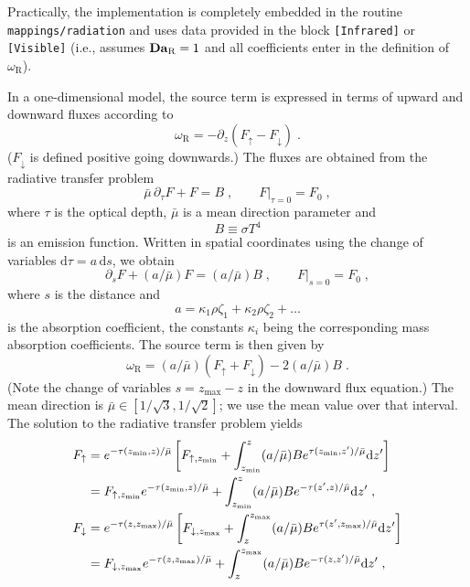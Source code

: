 Practically, the implementation is completely embedded in the routine {\tt mappings/radiation} and uses data provided in the block \texttt{[Infrared]} or \texttt{[Visible]} (i.e., assumes $\mathrm{\bf Da}_\mathrm{R}=1$ and all coefficients enter in the definition of $\omega_\mathrm{R}$). 

In a one-dimensional model, the source term is expressed in terms of upward and downward fluxes according to
\begin{equation}
    \omega_\mathrm{R}=-\partial_z(F_\uparrow -F_\downarrow) \;.
\end{equation}
($F_\downarrow$ is defined positive going downwards.) The fluxes are obtained from the radiative transfer problem
\begin{equation}
    \bar{\mu}\, \partial_\tau F+F = B\;,\qquad F|_{\tau=0}=F_0 \;,
\end{equation}
where $\tau$ is the optical depth, $\bar{\mu}$ is a mean direction parameter and
\begin{equation}\label{equ:sb}
    B\equiv \sigma T^4
\end{equation}
is an emission function. Written in spatial coordinates using the change of variables $\mathrm{d}\tau = a\,\mathrm{d}s$, we obtain
\begin{equation}\label{equ:rte}
    \partial_s F+(a/\bar{\mu}) F = (a/\bar{\mu}) B\;,\qquad F|_{s=0}=F_0 \;,
\end{equation}
where $s$ is the distance and 
\begin{equation}
    a = \kappa_1 \rho \zeta_1 + \kappa_2 \rho \zeta_2 + \ldots
\end{equation}
is the absorption coefficient, the constants $\kappa_i$ being the corresponding mass absorption coefficients. The source term is then given by
\begin{equation}
    \omega_\mathrm{R}=(a/\bar{\mu}) (F_\uparrow +F_\downarrow) - 2(a/\bar{\mu}) B \;.
\end{equation}
(Note the change of variables $s=z_\mathrm{max}-z$ in the downward flux equation.) The mean direction is $\bar{\mu}\in[1/\sqrt{3},1/\sqrt{2}]$; we use the mean value over that interval. The solution to the radiative transfer problem yields
\begin{subequations}\label{rad:flux}
    \begin{align}
        F_\uparrow &= e^{-\tau(z_\mathrm{min},z)/\bar{\mu}}\left[ F_{\uparrow,z_\mathrm{min}} + \int_{z_\mathrm{min}}^z (a/\bar{\mu}) B e^{\tau(z_\mathrm{min},z')/\bar{\mu}}\mathrm{d}z'\right]\notag \\
        &= F_{\uparrow,z_\mathrm{min}}e^{-\tau(z_\mathrm{min},z)/\bar{\mu}}+ \int_{z_\mathrm{min}}^z (a/\bar{\mu}) B e^{-\tau(z',z)/\bar{\mu}}\mathrm{d}z' \;,\\
        F_\downarrow &= e^{-\tau(z,z_\mathrm{max})/\bar{\mu}}\left[ F_{\downarrow,z_\mathrm{max}} + \int_z^{z_\mathrm{max}} (a/\bar{\mu}) B e^{\tau(z',z_\mathrm{max})/\bar{\mu}}\mathrm{d}z'\right]\notag \\
        &=F_{\downarrow,z_\mathrm{max}}e^{-\tau(z,z_\mathrm{max})/\bar{\mu}} + \int_z^{z_\mathrm{max}} (a/\bar{\mu}) B e^{-\tau(z,z')/\bar{\mu}}\mathrm{d}z'\;,
    \end{align}
\end{subequations}
